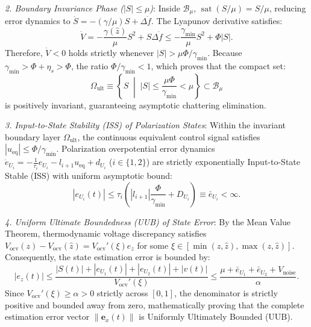 \documentclass[balance,nocopyright,upint,varvw,hyphenate,barcolor=NavyBlue,nolists]{asmejour}
\begin{document}
\emph{2. Boundary Invariance Phase ($|S| \le \mu$)}:
Inside $\mathcal{B}_\mu$, $\operatorname{sat}(S/\mu) = S/\mu$, reducing error dynamics to $\dot{S} = -(\gamma/\mu)S + \Delta \dot{f}$. The Lyapunov derivative satisfies:
\begin{equation}\label{eqn:app_v_dot_inv}
\dot{V} = -\frac{\gamma(\hat{z})}{\mu} S^2 + S \Delta \dot{f} \le -\frac{\gamma_{\min}}{\mu} S^2 + \Phi |S|.
\end{equation}
Therefore, $\dot{V} < 0$ holds strictly whenever $|S| > \mu \Phi / \gamma_{\min}$. Because $\gamma_{\min} > \Phi + \eta_s > \Phi$, the ratio $\Phi / \gamma_{\min} < 1$, which proves that the compact set:
\begin{equation}\label{eqn:app_omega_ult}
\Omega_{\text{ult}} \equiv \left\{ S \;\middle|\; |S| \le \frac{\mu \Phi}{\gamma_{\min}} < \mu \right\} \subset \mathcal{B}_\mu
\end{equation}
is positively invariant, guaranteeing asymptotic chattering elimination.

\emph{3. Input-to-State Stability (ISS) of Polarization States}:
Within the invariant boundary layer $\Omega_{\text{ult}}$, the continuous equivalent control signal satisfies $|u_{\text{eq}}| \le \Phi / \gamma_{\min}$. Polarization overpotential error dynamics $\dot{e}_{U_i} = -\frac{1}{\tau_i} e_{U_i} - l_{i+1} u_{\text{eq}} + d_{U_i}$ ($i \in \{1, 2\}$) are strictly exponentially Input-to-State Stable (ISS) with uniform asymptotic bound:
\begin{equation}\label{eqn:app_e_ui_bound}
|e_{U_i}(t)| \le \tau_i \left( |l_{i+1}| \frac{\Phi}{\gamma_{\min}} + D_{U_i} \right) \equiv \bar{e}_{U_i} < \infty.
\end{equation}

\emph{4. Uniform Ultimate Boundedness (UUB) of State Error}:
By the Mean Value Theorem, thermodynamic voltage discrepancy satisfies $V_{\text{ocv}}(z) - V_{\text{ocv}}(\hat{z}) = V_{\text{ocv}}'(\xi) e_z$ for some $\xi \in [\min(z, \hat{z}), \max(z, \hat{z})]$. Consequently, the state estimation error is bounded by:
\begin{equation}\label{eqn:app_e_z_bound}
|e_z(t)| \le \frac{|S(t)| + |e_{U_1}(t)| + |e_{U_2}(t)| + |v(t)|}{V_{\text{ocv}}'(\xi)} \le \frac{\mu + \bar{e}_{U_1} + \bar{e}_{U_2} + V_{\text{noise}}}{\alpha}.
\end{equation}
Since $V_{\text{ocv}}'(\xi) \ge \alpha > 0$ strictly across $[0, 1]$, the denominator is strictly positive and bounded away from zero, mathematically proving that the complete estimation error vector $\|\mathbf{e}_x(t)\|$ is Uniformly Ultimately Bounded (UUB).

\setlength{\bibsep}{1.8pt}
\clearpage

\newpage

\end{document}
